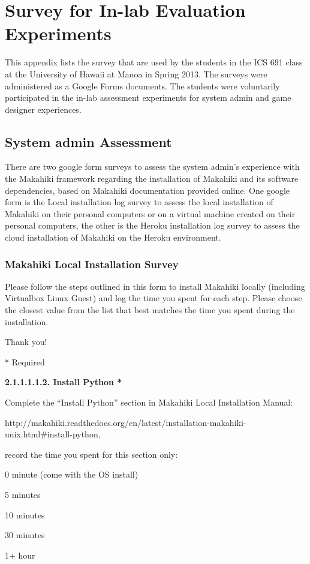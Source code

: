 \chapter{Survey for In-lab Evaluation Experiments}
\label{app:googleform}

This appendix lists the survey that are used by the students in the ICS 691 class at the University of Hawaii at Manoa in Spring 2013. The surveys were administered as a Google Forms documents. The students were voluntarily participated in the in-lab assessment experiments for system admin and game designer experiences.

\section{System admin Assessment}
There are two google form surveys to assess the system admin's experience with the Makahiki framework regarding the installation of Makahiki and its software dependencies, based on Makahiki documentation provided online. One google form is the Local installation log survey to assess the local installation of Makahiki on their personal computers or on a virtual machine created on their personal computers, the other is the Heroku installation log survey to assess the cloud installation of Makahiki on the Heroku environment.

\subsection{Makahiki Local Installation Survey}

\setlength{\parindent}{0pt}
\setlength{\parskip}{3mm}

Please follow the steps outlined in this form to install Makahiki locally (including Virtualbox Linux Guest) and log the time you spent for each step.
Please choose the closest value from the list that best matches the time you spent during the installation.

Thank you!

* Required

{\bf 2.1.1.1.1.2. Install Python *}

Complete the ``Install Python'' section in Makahiki Local Installation Manual:

http://makahiki.readthedocs.org/en/latest/installation-makahiki-unix.html\#install-python,

record the time you spent for this section only:

\begin{radiobutton}
\item 0 minute (come with the OS install)
\item 5 minutes
\item  10 minutes
\item  30 minutes
\item  1+ hour
\end{radiobutton}


